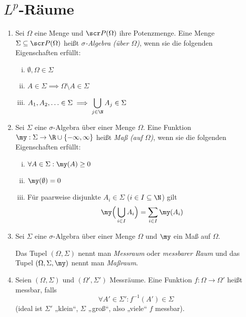 
\chapter{\texorpdfstring{$L^p$}{L\textasciicircum p}-Räume}


\begin{df} \label{2.1}
	\begin{enumerate}[1)]
		\item
			Sei $\Omega$ eine Menge und $\scr P(\Omega)$ ihre Potenzmenge.
			Eine Menge $\Sigma \subset \scr P(\Omega)$ heißt \emph{$\sigma$-Algebra (über $\Omega$)}, wenn sie die folgenden Eigenschaften erfüllt:
			\begin{enumerate}[(i)]
				\item
					$\displaystyle \emptyset, \Omega \in \Sigma$
				\item
					$\displaystyle A \in \Sigma \implies \Omega \setminus A \in \Sigma$
				\item
					$\displaystyle A_1, A_2, \dotsc \in \Sigma \implies \bigcup_{j\in \N} A_j \in \Sigma$
			\end{enumerate}
		\item
			Sei $\Sigma$ eine $\sigma$-Algebra über einer Menge $\Omega$.
			Eine Funktion $\my : \Sigma \to \R \cup \{-\infty, \infty\}$ heißt \emph{Maß (auf $\Omega$)}, wenn sie die folgenden Eigenschaften erfüllt:
			\begin{enumerate}[(i)]
				\item
					$\displaystyle \forall A \in \Sigma : \my(A) \ge 0$
				\item
					$\displaystyle \my(\emptyset) = 0$
				\item
					Für paarweise disjunkte $A_i \in \Sigma$ ($i \in I \subset \N$) gilt
					\[
						\my\Big(\bigcup_{i\in I} A_i\Big) = \sum_{i \in I} \my(A_i)
					\]
			\end{enumerate}
		\item
			Sei $\Sigma$ eine $\sigma$-Algebra über einer Menge $\Omega$ und $\my$ ein Maß auf $\Omega$.

			Das Tupel $(\Omega, \Sigma)$ nennt man \emph{Messraum} oder \emph{messbarer Raum} und das Tupel $(\Omega, \Sigma, \my)$ nennt man \emph{Maßraum}.
		\item
			Seien $(\Omega, \Sigma)$ und $(\Omega', \Sigma')$ Messräume.
			Eine Funktion $f: \Omega \to \Omega'$ heißt messbar, falls
			\[
				\forall A' \in \Sigma' : f^{-1}(A') \in \Sigma
			\]
			(ideal ist $\Sigma'$ „klein“, $\Sigma$ „groß“, also „viele“ $f$ messbar).
	\end{enumerate}
\end{df}

